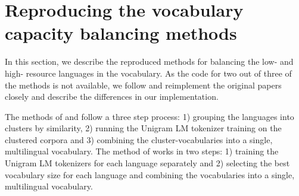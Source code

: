 \section{Reproducing the vocabulary capacity balancing methods}



In this section, we describe the reproduced methods for balancing the low- and high- resource languages in the vocabulary. As the code for two out of three of the methods is not available, we follow and reimplement the original papers closely and describe the differences in our implementation.

The methods of \citet{chung_improving_2020} and \citet{liang_xlm-v_2023} follow a three step process: 1) grouping the languages into clusters by similarity, 2) running the Unigram LM tokenizer training on the clustered corpora and 3) combining the cluster-vocabularies into a single, multilingual vocabulary. The method of \citet{zheng_allocating_2021} works in two steps: 1) training the Unigram LM tokenizers for each language separately and 2) selecting the best vocabulary size for each language and combining the vocabularies into a single, multilingual vocabulary.

